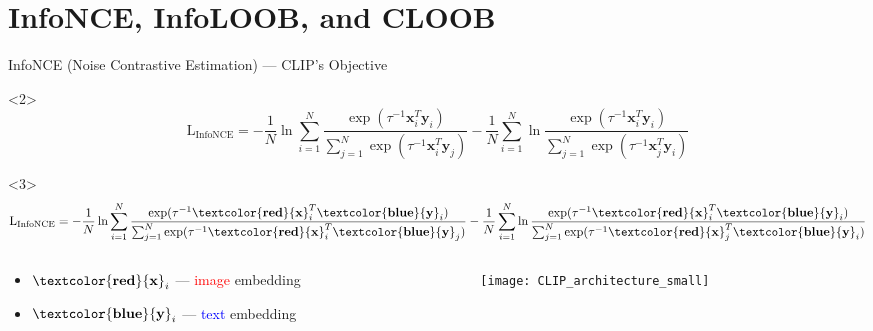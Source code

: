 \documentclass[utf8,aspectratio=169,ngerman,english,usenames,dvipsnames]{beamer}
\begin{document}
\section{InfoNCE, InfoLOOB, and CLOOB}

\begin{frame}{InfoNCE (Noise Contrastive Estimation) --- CLIP's Objective}
    \begin{onlyenv}<2>
        \begin{equation*}
            \operatorname{L_{InfoNCE}} =
            - \frac{1}{N} \ln \sum_{i=1}^{N} \frac{\exp(\tau^{-1} \mathbf{x}_i^T \mathbf{y}_i)}{\sum_{j=1}^{N} \exp(\tau^{-1} \mathbf{x}_i^T \mathbf{y}_j)}
            - \frac{1}{N} \sum_{i=1}^{N} \ln \frac{\exp(\tau^{-1} \mathbf{x}_i^T \mathbf{y}_i)}{\sum_{j=1}^{N} \exp(\tau^{-1} \mathbf{x}_j^T \mathbf{y}_i)}
        \end{equation*}
    \end{onlyenv}

    \begin{onlyenv}<3>
        \begin{equation*}
            \operatorname{L_{InfoNCE}} =
            - \frac{1}{N} \ln \sum_{i=1}^{N} \frac{\exp(\tau^{-1} \mathbf{\textcolor{red}{x}}_i^T \mathbf{\textcolor{blue}{y}}_i)}{\sum_{j=1}^{N} \exp(\tau^{-1} \mathbf{\textcolor{red}{x}}_i^T \mathbf{\textcolor{blue}{y}}_j)}
            - \frac{1}{N} \sum_{i=1}^{N} \ln \frac{\exp(\tau^{-1} \mathbf{\textcolor{red}{x}}_i^T \mathbf{\textcolor{blue}{y}}_i)}{\sum_{j=1}^{N} \exp(\tau^{-1} \mathbf{\textcolor{red}{x}}_j^T \mathbf{\textcolor{blue}{y}}_i)}
        \end{equation*}
        \begin{columns}
            \begin{column}{0.5\textwidth}
                \begin{itemize}
                    \item $\mathbf{\textcolor{red}{x}}_i$ --- \textcolor{red}{image} embedding
                    \item $\mathbf{\textcolor{blue}{y}}_i$ --- \textcolor{blue}{text} embedding
                \end{itemize}
            \end{column}
            \begin{column}{0.5\textwidth}
                \begin{figure}
                    \centering
                    \texttt{[image: CLIP\_architecture\_small]}
                \end{figure}
            \end{column}
        \end{columns}
    \end{onlyenv}


\end{frame}
\end{document}
